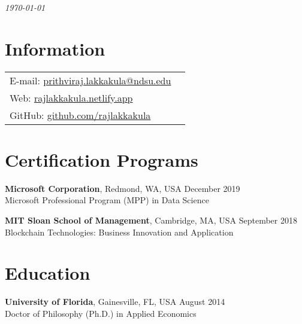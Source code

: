 \documentclass[margin,line]{res}
\begin{document}
 \hfill{\em \today}

\begin{resume}

\section{\sc Information}

\vspace{.05in}
\begin{tabular}{@{}p{3.5in}p{3in}}
{E-mail:} \href{mailto:prithviraj.lakkakula@ndsu.edu}{prithviraj.lakkakula@ndsu.edu}\\
{Web:} \href{https://rajlakkakula.netlify.app/}{rajlakkakula.netlify.app}\\
{GitHub:} \href{https://github.com/rajlakkakula}{github.com/rajlakkakula}
\end{tabular}

\section{\sc Certification Programs}
{\bf Microsoft Corporation}, Redmond, WA, USA  \hfill December 2019\\
Microsoft Professional Program (MPP) in Data Science \hfill

{\bf MIT Sloan School of Management}, Cambridge, MA, USA \hfill September 2018\\
Blockchain Technologies: Business Innovation and Application \hfill

\section{\sc Education}

{\bf University of Florida}, Gainesville, FL, USA \hfill August 2014\\
Doctor of Philosophy (Ph.D.) in Applied Economics \hfill


\end{resume}
\end{document}
